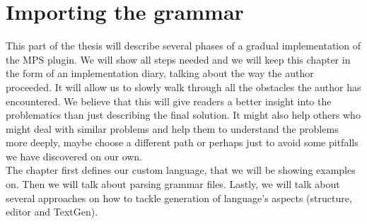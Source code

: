 \chapter{Importing the grammar}
\label{chap:importing_the_grammar}

This part of the thesis will describe several phases of a gradual implementation of the MPS plugin.
We will show all steps needed and we will keep this chapter in the form of an implementation diary, talking about the way the author proceeded.
It will allow us to slowly walk through all the obstacles the author has encountered.
We believe that this will give readers a better insight into the problematics than just describing the final solution.
It might also help others who might deal with similar problems and help them to understand the problems more deeply, maybe choose a different path or perhaps just to avoid some pitfalls we have discovered on our own.
\\

The chapter first defines our custom language, that we will be showing examples on.
Then we will talk about parsing grammar files.
Lastly, we will talk about several approaches on how to tackle generation of language's aspects (structure, editor and TextGen).

%


%


%


%

\pagebreak



\pagebreak

